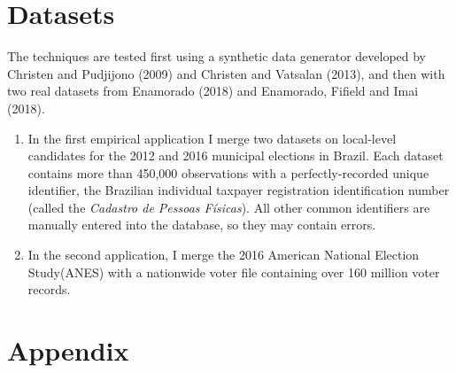 \documentclass[11pt,reqno]{amsart}
\begin{document}
\section{Datasets}
The techniques are tested first using a synthetic data generator developed by Christen and Pudjijono (2009) and Christen and Vatsalan (2013), and then with two real datasets from Enamorado (2018) and Enamorado, Fifield and Imai (2018). 
\begin{enumerate}
\item In the first empirical application I merge two datasets on local-level candidates for the 2012 and 2016 municipal elections in Brazil.  Each dataset contains more than 450,000 observations with a perfectly-recorded unique identifier, the Brazilian individual taxpayer registration identification number (called the \textit{Cadastro de Pessoas F\'isicas}).  All other common identifiers are manually entered into the database, so they may contain errors.  

\item In the second application, I merge the 2016 American National Election Study(ANES) with a nationwide voter file containing over 160 million voter records.  
\end{enumerate}



\newpage




\newpage
\appendix
\section{Appendix}
\end{document}
